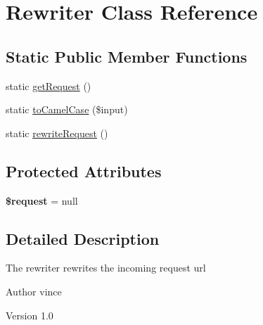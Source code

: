 \hypertarget{class_anemo_1_1_controller_1_1_router_1_1_rewriter}{
\section{Rewriter Class Reference}
\label{class_anemo_1_1_controller_1_1_router_1_1_rewriter}
}
\subsection*{Static Public Member Functions}
\begin{DoxyCompactItemize}
\item 
static \hyperlink{class_anemo_1_1_controller_1_1_router_1_1_rewriter_a8bc323d82e5265f16d9cd356d0a02dba}{getRequest} ()
\item 
static \hyperlink{class_anemo_1_1_controller_1_1_router_1_1_rewriter_ac373a9b942c85bf06e50d77072ceb503}{toCamelCase} (\$input)
\item 
static \hyperlink{class_anemo_1_1_controller_1_1_router_1_1_rewriter_abd8ecc8de4ef870f069ea085128cc73f}{rewriteRequest} ()
\end{DoxyCompactItemize}
\subsection*{Protected Attributes}
\begin{DoxyCompactItemize}
\item 
\hypertarget{class_anemo_1_1_controller_1_1_router_1_1_rewriter_abb35c8495a232b510389fa6d7b15d38a}{
{\bfseries \$request} = null}
\label{class_anemo_1_1_controller_1_1_router_1_1_rewriter_abb35c8495a232b510389fa6d7b15d38a}

\end{DoxyCompactItemize}


\subsection{Detailed Description}
The rewriter rewrites the incoming request url \begin{DoxyAuthor}{Author}
vince 
\end{DoxyAuthor}
\begin{DoxyVersion}{Version}
1.0 
\end{DoxyVersion}


